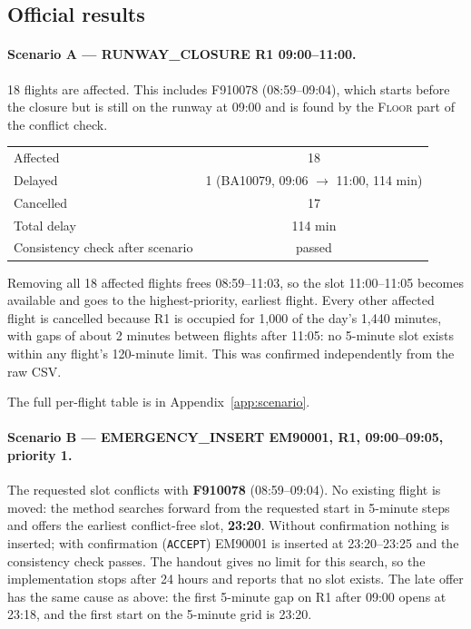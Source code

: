 \documentclass[11pt]{article}
\begin{document}
\subsection{Official results}

\paragraph{Scenario A --- RUNWAY\_CLOSURE R1 09:00--11:00.}
18 flights are affected. This includes F910078 (08:59--09:04), which starts
before the closure but is still on the runway at 09:00 and is found by the
\textsc{Floor} part of the conflict check.

\begin{center}
\begin{tabular}{@{}lc@{}}
\toprule
Affected & 18 \\
Delayed & 1 (BA10079, 09:06 $\to$ 11:00, 114 min) \\
Cancelled & 17 \\
Total delay & 114 min \\
Consistency check after scenario & passed \\
\bottomrule
\end{tabular}
\end{center}

Removing all 18 affected flights frees 08:59--11:03, so the slot 11:00--11:05
becomes available and goes to the highest-priority, earliest flight. Every
other affected flight is cancelled because R1 is occupied for 1{,}000 of the
day's 1{,}440 minutes, with gaps of about 2 minutes between flights after 11:05:
no 5-minute slot exists within any flight's 120-minute limit. This was
confirmed independently from the raw CSV.

The full per-flight table is in Appendix~\ref{app:scenario}.

\paragraph{Scenario B --- EMERGENCY\_INSERT EM90001, R1, 09:00--09:05, priority 1.}
The requested slot conflicts with \textbf{F910078} (08:59--09:04). No existing
flight is moved: the method searches forward from the requested start in
5-minute steps and offers the earliest conflict-free slot, \textbf{23:20}.
Without confirmation nothing is inserted; with confirmation (\texttt{ACCEPT})
EM90001 is inserted at 23:20--23:25 and the consistency check passes. The
handout gives no limit for this search, so the implementation stops after
24 hours and reports that no slot exists. The late offer has the same cause
as above: the first 5-minute gap on R1 after 09:00 opens at 23:18, and the
first start on the 5-minute grid is 23:20.
\end{document}
